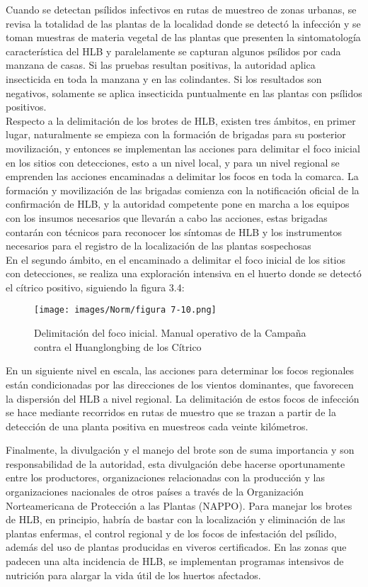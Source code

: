 Cuando se detectan psílidos infectivos en rutas de muestreo de zonas urbanas, se revisa la totalidad de las plantas de la localidad donde se detectó la infección y se toman muestras de materia vegetal de las plantas que presenten la sintomatología característica del HLB y paralelamente se capturan algunos psílidos por cada manzana de casas. Si las pruebas resultan positivas, la autoridad aplica insecticida en toda la manzana y en las colindantes. Si los resultados son negativos, solamente se aplica insecticida puntualmente en las plantas con psílidos positivos.\\
Respecto a la delimitación de los brotes de HLB, existen tres ámbitos, en primer lugar, naturalmente se empieza con la formación de brigadas para su posterior movilización, y entonces se implementan las acciones para delimitar el foco inicial en los sitios con detecciones, esto a un nivel local, y para un nivel regional se emprenden las acciones encaminadas a delimitar los focos en toda la comarca. La formación y movilización de las brigadas comienza con la notificación oficial  de la confirmación de HLB, y la autoridad competente pone en marcha a los equipos con los insumos necesarios que llevarán a cabo las acciones, estas brigadas contarán con técnicos para reconocer los síntomas de HLB y los instrumentos necesarios para el registro de la localización de las plantas sospechosas\\
En el segundo ámbito, en el encaminado a delimitar el foco inicial de los sitios con detecciones, se realiza una exploración intensiva en el huerto donde se detectó el cítrico positivo, siguiendo la figura 3.4:\\

\begin{figure}[H]
\centering
\texttt{[image: images/Norm/figura 7-10.png]}
\caption{Delimitación del foco inicial. Manual operativo de la Campaña contra el Huanglongbing de los Cítrico}
\end{figure}

En un siguiente nivel en escala, las acciones para determinar los focos regionales están condicionadas por las direcciones de los vientos dominantes, que favorecen la dispersión del HLB a nivel regional. La delimitación de estos focos de infección se hace mediante recorridos en rutas de muestro que se trazan a partir de la detección de una planta positiva en muestreos cada veinte kilómetros.

Finalmente, la divulgación y el manejo del brote son de suma importancia y son responsabilidad de la autoridad, esta divulgación debe hacerse oportunamente entre los productores, organizaciones relacionadas con la producción y las organizaciones nacionales de otros países a través de la Organización Norteamericana de Protección a las Plantas (NAPPO). Para manejar los brotes de HLB, en principio, habría de bastar con la localización y eliminación de las plantas enfermas, el control regional y de los focos de infestación del psílido, además del uso de plantas producidas en viveros certificados. En las zonas que padecen una alta incidencia de HLB, se implementan programas intensivos de nutrición para alargar la vida útil de los huertos afectados.

